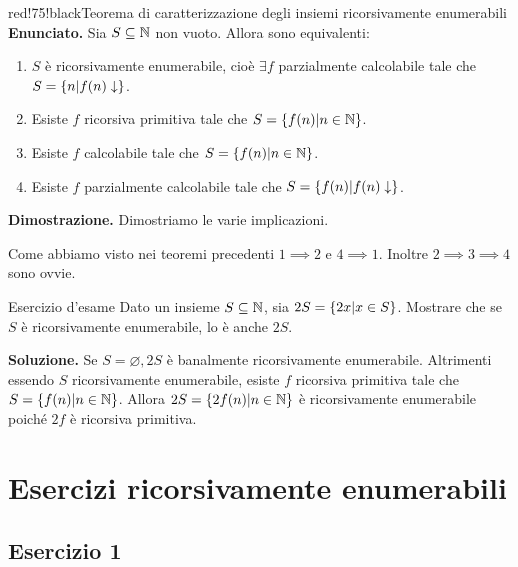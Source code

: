 \begin{halfframedbox}{red!75!black}{Teorema di caratterizzazione degli insiemi ricorsivamente enumerabili}
  \textbf{Enunciato. } Sia \(S \subseteq \mathbb{N}\) non vuoto. Allora sono equivalenti:
  \begin{enumerate}
    \item \(S\) è ricorsivamente enumerabile, cioè \(\exists f\) parzialmente calcolabile tale che \(S=\displaystyle{\left\{{n \vert f(n) \downarrow}\right\}}\).
    \item Esiste \(f\) ricorsiva primitiva tale che \(S=\displaystyle{\left\{{f(n) \vert n \in \mathbb{N}}\right\}}\).
    \item Esiste \(f\) calcolabile tale che \(S=\displaystyle{\left\{{f(n) \vert n \in \mathbb{N}}\right\}}\).
    \item Esiste \(f\) parzialmente calcolabile tale che \(S=\displaystyle{\left\{{f(n) \vert f(n) \downarrow}\right\}}\).
  \end{enumerate}
\begin{center}
  \textcolor{red!75!black}{\hdashrule[0.5ex]{18cm}{1pt}{3mm 3pt 1mm 2pt}}
\end{center}

\textbf{Dimostrazione. } Dimostriamo le varie implicazioni.

Come abbiamo visto nei teoremi precedenti \(1 \implies 2\) e \(4 \implies 1\). Inoltre \(2 \implies 3 \implies 4\) sono ovvie.
\end{halfframedbox}

\begin{generalbox}[colframe=azure-gradient-3!90!black]{Esercizio d'esame}
  Dato un insieme \(S \subseteq \mathbb{N}\), sia \(2S=\displaystyle{\left\{{2x \vert x \in S}\right\}}\). Mostrare che se \(S\) è ricorsivamente enumerabile, lo è anche \(2S\).

  \textbf{Soluzione. } Se \(S= \varnothing, 2S\) è banalmente ricorsivamente enumerabile. Altrimenti essendo \(S\) ricorsivamente enumerabile, esiste \(f\) ricorsiva primitiva tale che \(S=\displaystyle{\left\{{f(n) \vert n \in \mathbb{N}}\right\}}\). Allora \(2S=\displaystyle{\left\{{2f(n) \vert n \in \mathbb{N}}\right\}}\) è ricorsivamente enumerabile poiché \(2f\) è ricorsiva primitiva.
\end{generalbox}


\section {Esercizi ricorsivamente enumerabili}

\subsection{Esercizio 1}

